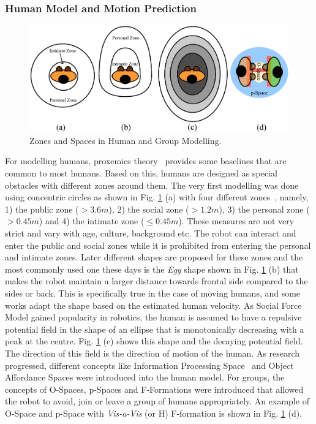 \subsubsection{Human Model and Motion Prediction}
\begin{figure}[!h]
    \centering
    \includegraphics[width=0.95\columnwidth]{images/proxemics.eps}
    \caption{Zones and Spaces in Human and Group Modelling.}
    \label{fig:proxemics}
\end{figure}
For modelling humans, proxemics theory~\cite{mishra1983proxemics} provides some baselines that are common to most humans. Based on this, humans are designed as special obstacles with different zones around them. The very first modelling was done using concentric circles as shown in Fig. \ref{fig:proxemics} (a) with four different zones~\cite{rios2015proxemics}, namely, 1) the public zone ($> 3.6m$), 2) the social zone ($> 1.2m$), 3) the personal zone ($> 0.45m$) and 4) the intimate zone ($\leq 0.45m$). These measures are not very strict and vary with age, culture, background etc. The robot can interact and enter the public and social zones while it is prohibited from entering the personal and intimate zones. Later different shapes are proposed for these zones \cite{rios2015proxemics} and the most commonly used one these days is the \textit{Egg} shape shown in Fig. \ref{fig:proxemics} (b) that makes the robot maintain a larger distance towards frontal side compared to the sides or back. This is specifically true in the case of moving humans, and some works \cite{kostavelis2016human} adapt the shape based on the estimated human velocity. As Social Force Model \cite{helbing1995social} gained popularity in robotics, the human is assumed to have a repulsive potential field in the shape of an ellipse that is monotonically decreasing with a peak at the centre. Fig. \ref{fig:proxemics} (c) shows this shape and the decaying potential field. The direction of this field is the direction of motion of the human. As research progressed, different concepts like Information Processing Space~\cite{kitazawa2010pedestrian} and Object Affordance Spaces were introduced into the human model. For groups, the concepts of O-Spaces, p-Spaces and F-Formations \cite{rios2015proxemics} were introduced that allowed the robot to avoid, join or leave a group of humans appropriately. An example of O-Space and p-Space with \textit{Vis-a-Vis} (or H) F-formation is shown in Fig. \ref{fig:proxemics} (d). 

